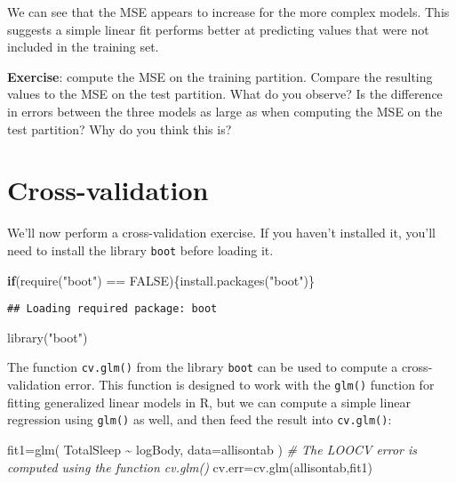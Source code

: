 \documentclass[
]{book}
\newenvironment{Shaded}{\begin{snugshade}}{\end{snugshade}}
\newcommand{\AttributeTok}[1]{\textcolor[rgb]{0.77,0.63,0.00}{#1}}
\newcommand{\CommentTok}[1]{\textcolor[rgb]{0.56,0.35,0.01}{\textit{#1}}}
\newcommand{\ConstantTok}[1]{\textcolor[rgb]{0.00,0.00,0.00}{#1}}
\newcommand{\ControlFlowTok}[1]{\textcolor[rgb]{0.13,0.29,0.53}{\textbf{#1}}}
\newcommand{\FunctionTok}[1]{\textcolor[rgb]{0.00,0.00,0.00}{#1}}
\newcommand{\NormalTok}[1]{#1}
\newcommand{\OtherTok}[1]{\textcolor[rgb]{0.56,0.35,0.01}{#1}}
\newcommand{\SpecialCharTok}[1]{\textcolor[rgb]{0.00,0.00,0.00}{#1}}
\newcommand{\StringTok}[1]{\textcolor[rgb]{0.31,0.60,0.02}{#1}}
\begin{document}
We can see that the MSE appears to increase for the more complex models. This suggests a simple linear fit performs better at predicting values that were not included in the training set.

\textbf{Exercise}: compute the MSE on the training partition. Compare the resulting values to the MSE on the test partition. What do you observe? Is the difference in errors between the three models as large as when computing the MSE on the test partition? Why do you think this is?

\hypertarget{cross-validation}{%
\section{Cross-validation}\label{cross-validation}}

We'll now perform a cross-validation exercise. If you haven't installed it, you'll need to install the library \texttt{boot} before loading it.

\begin{Shaded}
\begin{Highlighting}[]
\ControlFlowTok{if}\NormalTok{(}\FunctionTok{require}\NormalTok{(}\StringTok{"boot"}\NormalTok{) }\SpecialCharTok{==} \ConstantTok{FALSE}\NormalTok{)\{}\FunctionTok{install.packages}\NormalTok{(}\StringTok{"boot"}\NormalTok{)\}}
\end{Highlighting}
\end{Shaded}

\begin{verbatim}
## Loading required package: boot
\end{verbatim}

\begin{Shaded}
\begin{Highlighting}[]
\FunctionTok{library}\NormalTok{(}\StringTok{"boot"}\NormalTok{)}
\end{Highlighting}
\end{Shaded}

The function \texttt{cv.glm()} from the library \texttt{boot} can be used to compute a cross-validation error. This function is designed to work with the \texttt{glm()} function for fitting generalized linear models in R, but we can compute a simple linear regression using \texttt{glm()} as well, and then feed the result into \texttt{cv.glm()}:

\begin{Shaded}
\begin{Highlighting}[]
\NormalTok{fit1}\OtherTok{=}\FunctionTok{glm}\NormalTok{( TotalSleep }\SpecialCharTok{\textasciitilde{}}\NormalTok{ logBody, }\AttributeTok{data=}\NormalTok{allisontab )}
\CommentTok{\# The LOOCV error is computed using the function cv.glm()}
\NormalTok{cv.err}\OtherTok{=}\FunctionTok{cv.glm}\NormalTok{(allisontab,fit1)}
\end{Highlighting}
\end{Shaded}
\end{document}
